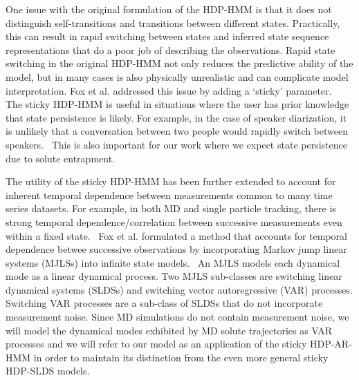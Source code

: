 \documentclass[journal=jpcbfk,manuscript=article]{achemso}
\begin{document}
  One issue with the original formulation of the HDP-HMM is that it does 
  not distinguish self-transitions and transitions between different states.
  Practically, this can result in rapid switching between states and inferred
  state sequence representations that do a poor job of describing the 
  observations. Rapid state switching in the original HDP-HMM not only 
  reduces the predictive ability of the model, but in many cases is also 
  physically unrealistic and can complicate model interpretation. 
  Fox et al. addressed this issue by adding a `sticky'
  parameter.~\cite{fox_sticky_2007} The sticky HDP-HMM is useful in situations
  where the user has prior knowledge that state persistence is likely.
  For example, in the case of speaker diarization, it is unlikely that a 
  conversation between two people would rapidly switch between speakers.~\cite{fox_sticky_2011}
  This is also important for our work where we expect state persistence due
  to solute entrapment.   
  
  The utility of the sticky HDP-HMM has been further extended to account for
  inherent temporal dependence between measurements common to many time series
  datasets. For example, in both MD and single particle tracking, there is 
  strong temporal dependence/correlation between successive measurements even
  within a fixed state.~\cite{calderon_data-driven_2014}
  Fox et al. formulated a method that accounts for temporal dependence betwee
  successive observations by incorporating Markov jump linear systems (MJLSs)
  into infinite state models.~\cite{fox_nonparametric_2009} An MJLS models 
  each dynamical mode as a linear dynamical process. Two MJLS sub-classes are 
  switching linear dynamical systems (SLDSs) and switching vector autoregressive
  (VAR) processes. Switching VAR processes are a sub-class of SLDSs that do not
  incorporate measurement noise. Since MD simulations do not contain measurement
  noise, we will model the dynamical modes exhibited by MD solute trajectories 
  as VAR processes and we will refer to our model as an application of the 
  sticky HDP-AR-HMM in order to maintain its distinction from the even more
  general sticky HDP-SLDS models.
  
\end{document}
